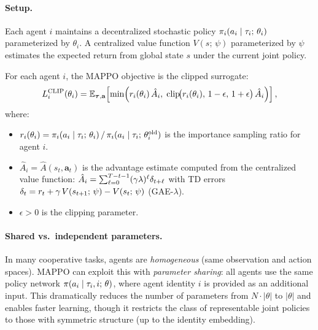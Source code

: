 \documentclass[11pt,a4paper]{article}
\begin{document}
\paragraph{Setup.}
Each agent $i$ maintains a decentralized stochastic policy
$\pi_i(a_i \mid \tau_i;\, \theta_i)$ parameterized by
$\theta_i$.  A centralized value function $V(s;\, \psi)$
parameterized by $\psi$ estimates the expected return from
global state $s$ under the current joint policy.

\begin{definition}
\label{def:mappo}
For each agent $i$, the MAPPO objective is the clipped surrogate:
\begin{equation}
\label{eq:mappo-clip}
  L_i^{\mathrm{CLIP}}(\theta_i)
  = \mathbb{E}_{\boldsymbol{\tau}, \mathbf{a}}\!\left[
    \min\!\left(
      r_i(\theta_i)\, \hat{A}_i,\;
      \mathrm{clip}\!\big(r_i(\theta_i),\, 1 - \epsilon,\,
        1 + \epsilon\big)\, \hat{A}_i
    \right)
  \right],
\end{equation}
where:
\begin{itemize}[nosep]
  \item $r_i(\theta_i) = \pi_i(a_i \mid \tau_i;\, \theta_i)
    \,/\, \pi_i(a_i \mid \tau_i;\, \theta_i^{\mathrm{old}})$
    is the importance sampling ratio for agent $i$.
  \item $\hat{A}_i = \hat{A}(s_t, \mathbf{a}_t)$ is the
    advantage estimate computed from the centralized value function:
    $\hat{A}_i = \sum_{\ell=0}^{T-t-1} (\gamma \lambda)^\ell
    \delta_{t+\ell}$ with TD errors $\delta_t = r_t + \gamma\,
    V(s_{t+1};\, \psi) - V(s_t;\, \psi)$ (GAE-$\lambda$).
  \item $\epsilon > 0$ is the clipping parameter.
\end{itemize}
\end{definition}

\paragraph{Shared vs.\ independent parameters.}
In many cooperative tasks, agents are \emph{homogeneous} (same
observation and action spaces).  MAPPO can exploit this with
\emph{parameter sharing}: all agents use the same policy network
$\pi(a_i \mid \tau_i, i;\, \theta)$, where agent identity
$i$ is provided as an additional input.  This dramatically reduces
the number of parameters from $N \cdot |\theta|$ to $|\theta|$ and
enables faster learning, though it restricts the class of
representable joint policies to those with symmetric structure
(up to the identity embedding).
\end{document}
